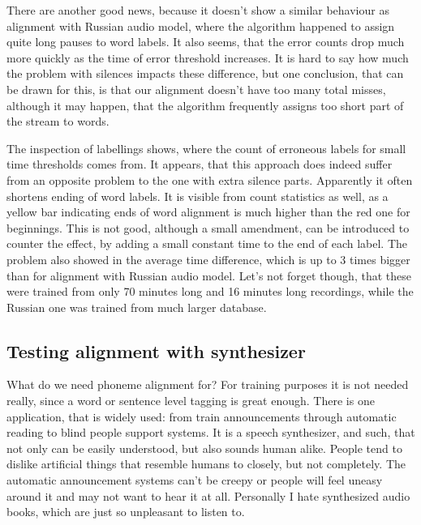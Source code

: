 \documentclass[12pt,a4paper,english]{article}
\begin{document}
There are another good news, because it doesn't show a similar behaviour as alignment with Russian audio model, where the algorithm happened to assign quite long pauses to word labels.
It also seems, that the error counts drop much more quickly as the time of error threshold increases. It is hard to say how much the problem with silences impacts these difference, but one conclusion, that can be drawn for this, is that our alignment doesn't have too many total misses, although it may happen, that the algorithm frequently assigns too short part of the stream to words. \newline

The inspection of labellings shows, where the count of erroneous labels for small time thresholds comes from. It appears, that this approach does indeed suffer from an opposite problem to the one with extra silence parts. Apparently it often shortens ending of word labels. It is visible from count statistics as well, as a yellow bar indicating ends of word alignment is much higher than the red one for beginnings.
This is not good, although a small amendment, can be introduced to counter the effect, by adding a small constant time to the end of each label. \newline
The problem also showed in the average time difference, which is up to 3 times bigger than for alignment with Russian audio model. Let's not forget though, that these were trained from only 70 minutes long and 16 minutes long recordings, while the Russian one was trained from much larger database.

\newpage
\begin{center}
    \section{Testing alignment with synthesizer}
\end {center}
\setcounter{equation}{0}

What do we need phoneme alignment for? For training purposes it is not needed really, since a word or sentence level tagging is great enough. \newline
There is one application, that is widely used: from train announcements through automatic reading to  blind people support systems. It is a speech synthesizer, and such, that not only can be easily understood, but also sounds human alike. People tend to dislike artificial things that resemble humans to closely, but not completely. The automatic announcement systems can't be creepy or people will feel uneasy around it and may not want to hear it at all. Personally I hate synthesized audio books, which are just so unpleasant to listen to. \newline
\end{document}
